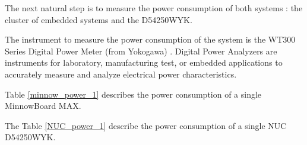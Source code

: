 The next natural step is to measure the power consumption of both systems : the
cluster of embedded systems and the D54250WYK.

The instrument to measure the power consumption of the system is the WT300
Series Digital Power Meter (from Yokogawa) . Digital Power Analyzers are
instruments for laboratory, manufacturing test, or embedded applications to
accurately measure and analyze electrical power characteristics.

Table \ref{minnow_power_1} describes the power consumption of a single
MinnowBoard MAX.

\begin{table}[]
    \centering
    \label{minnow_power_1}
\end{table}


The Table \ref{NUC_power_1} describe the power consumption of a single NUC
D54250WYK.


